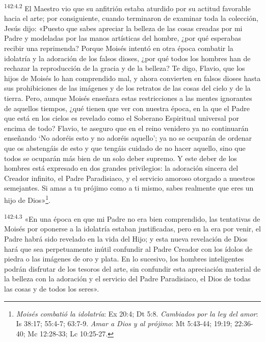 \par 
\textsuperscript{142:4.2} El Maestro vio que su anfitrión estaba aturdido por su actitud favorable hacia el arte; por consiguiente, cuando terminaron de examinar toda la colección, Jesús dijo: «Puesto que sabes apreciar la belleza de las cosas creadas por mi Padre y modeladas por las manos artísticas del hombre, ¿por qué esperabas recibir una reprimenda? Porque Moisés intentó en otra época combatir la idolatría y la adoración de los falsos dioses, ¿por qué todos los hombres han de rechazar la reproducción de la gracia y de la belleza? Te digo, Flavio, que los hijos de Moisés lo han comprendido mal, y ahora convierten en falsos dioses hasta sus prohibiciones de las imágenes y de los retratos de las cosas del cielo y de la tierra. Pero, aunque Moisés enseñara estas restricciones a las mentes ignorantes de aquellos tiempos, ¿qué tienen que ver con nuestra época, en la que el Padre que está en los cielos es revelado como el Soberano Espiritual universal por encima de todo? Flavio, te aseguro que en el reino venidero ya no continuarán enseñando `No adoréis esto y no adoréis aquello'; ya no se ocuparán de ordenar que os abstengáis de esto y que tengáis cuidado de no hacer aquello, sino que todos se ocuparán más bien de un solo deber supremo. Y este deber de los hombres está expresado en dos grandes privilegios: la adoración sincera del Creador infinito, el Padre Paradisiaco, y el servicio amoroso otorgado a nuestros semejantes. Si amas a tu prójimo como a ti mismo, sabes realmente que eres un hijo de Dios»\footnote{\textit{Moisés combatió la idolatría}: Ex 20:4; Dt 5:8. \textit{Cambiados por la ley del amor}: Is 38:17; 55:4-7; 63:7-9. \textit{Amar a Dios y al prójimo}: Mt 5:43-44; 19:19; 22:36-40; Mc 12:28-33; Lc 10:25-27.}.

\par 
\textsuperscript{142:4.3} «En una época en que mi Padre no era bien comprendido, las tentativas de Moisés por oponerse a la idolatría estaban justificadas, pero en la era por venir, el Padre habrá sido revelado en la vida del Hijo; y esta nueva revelación de Dios hará que sea perpetuamente inútil confundir al Padre Creador con los ídolos de piedra o las imágenes de oro y plata. En lo sucesivo, los hombres inteligentes podrán disfrutar de los tesoros del arte, sin confundir esta apreciación material de la belleza con la adoración y el servicio del Padre Paradisiaco, el Dios de todas las cosas y de todos los seres».

